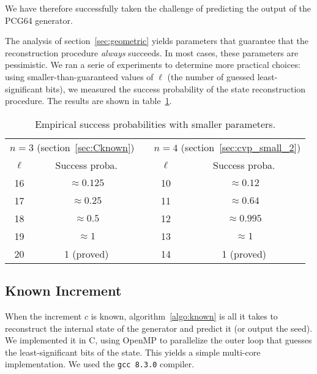 \documentclass[journal=tosc,final]{iacrtrans}
\begin{document}
We have therefore successfully taken the challenge of predicting the output of
the \textsf{PCG64} generator.

The analysis of section~\ref{sec:geometric} yields parameters that guarantee
that the reconstruction procedure \emph{always} succeeds. In most cases, these
parameters are pessimistic. We ran a serie of experiments to determine more
practical choices: using smaller-than-guaranteed values of $\ell$ (the number of
guessed least-significant bits), we measured the success probability of the
state reconstruction procedure. The results are shown in table~\ref{tab:empirical}.

\begin{table}
  \centering
\begin{tabular}{|c|c|c|c|c|}
  \cline{1-2}\cline{4-5}
  \multicolumn{2}{|c|}{$n=3$ (section~\ref{sec:Cknown})} & &  \multicolumn{2}{c|}{$n=4$ (section~\ref{sec:cvp_small_2})} \\
  \cline{1-2}\cline{4-5}
  $\ell$ & Success proba. && $\ell$ & Success proba. \\
  \cline{1-2}\cline{4-5}
  \noalign{\vskip\doublerulesep
  \vskip-\arrayrulewidth}
  \cline{1-2}\cline{4-5}
  16 & $\approx 0.125$     && 10 &  $\approx 0.12$ \\
  \cline{1-2}\cline{4-5}
  17 & $\approx 0.25$     && 11 &  $\approx 0.64$ \\
  \cline{1-2}\cline{4-5}
  18 & $\approx 0.5$      && 12 &  $\approx 0.995$ \\
  \cline{1-2}\cline{4-5}
  19 & \(\approx 1\)                  && 13 &  \(\approx 1\) \\
  \cline{1-2}\cline{4-5}
  20 & 1 (proved)         && 14 &  1 (proved) \\
  \cline{1-2}\cline{4-5}
\end{tabular}
\caption{Empirical success probabilities with smaller parameters.}
\label{tab:empirical}
\end{table}

\subsection{Known Increment}

When the increment $c$ is known, algorithm~\ref{algo:known} is all it takes to
reconstruct the internal state of the generator and predict it (or output the
seed). We implemented it in \textsf{C}, using \textsf{OpenMP} to parallelize the
outer loop that guesses the least-significant bits of the state. This yields a
simple multi-core implementation. We used the \texttt{gcc 8.3.0} compiler.
\end{document}
